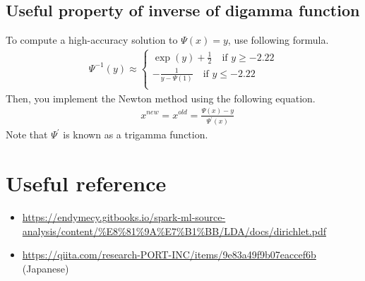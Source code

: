 \documentclass[10.5pt,letterpaper]{article}
\theoremstyle{plain}
\begin{document}
\subsection{Useful property of inverse of digamma function}
To compute a high-accuracy solution to $\Psi(x) = y$, use following formula.
\begin{align}
\Psi^{-1}(y) \approx \begin{cases}
\exp(y) + \frac{1}{2} \quad  \textrm{if $y\geq -2.22$} \\
-\frac{1}{y - \Psi(1)} \quad  \textrm{if $y \leq -2.22$} \\
\end{cases}
\end{align}
Then, you implement the Newton method using the following equation.
\begin{align}
& x^{new} = x^{old} = \frac{\Psi(x) - y}{ \Psi^\prime(x) }
\end{align}
Note that $\Psi^\prime$ is known as a trigamma function. 
\section{Useful reference}
\begin{itemize}
\item
\url{https://endymecy.gitbooks.io/spark-ml-source-analysis/content/\%E8\%81\%9A\%E7\%B1\%BB/LDA/docs/dirichlet.pdf}
\item
\url{https://qiita.com/research-PORT-INC/items/9e83a49f9b07eaccef6b} (Japanese)
\end{itemize}
\end{document}
